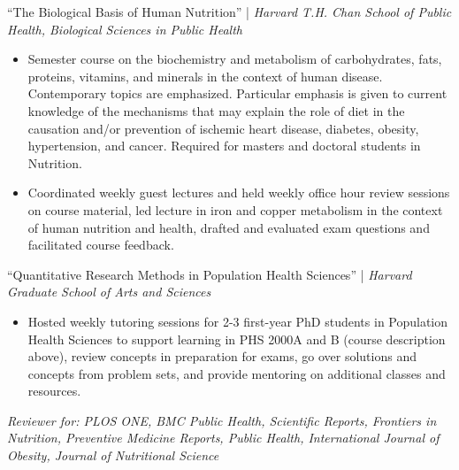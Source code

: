 \documentclass{cv_style}
\begin{document}
``The Biological Basis of Human Nutrition'' | \textit{Harvard T.H. Chan School of Public Health, Biological Sciences in Public Health}
\begin{itemize}
  \vspace{0em} \item Semester course on the biochemistry and metabolism of carbohydrates, fats, proteins, vitamins, and minerals in the context of human disease. Contemporary topics are emphasized. Particular emphasis is given to current knowledge of the mechanisms that may explain the role of diet in the causation and/or prevention of ischemic heart disease, diabetes, obesity, hypertension, and cancer. Required for masters and doctoral students in Nutrition.
  \item \parskip 1pt Coordinated weekly guest lectures and held weekly office hour review sessions on course material, led lecture in iron and copper metabolism in the context of human nutrition and health, drafted and evaluated exam questions and facilitated course feedback.
\end{itemize}

``Quantitative Research Methods in Population Health Sciences'' | \textit{Harvard Graduate School of Arts and Sciences}
\begin{itemize}
  \vspace{0em} \item Hosted weekly tutoring sessions for 2-3 first-year PhD students in Population Health Sciences to support learning in PHS 2000A and B (course description above), review concepts in preparation for exams, go over solutions and concepts from problem sets, and provide mentoring on additional classes and resources.
\end{itemize}


\parskip -5pt 
\nocite{*}
\printbibliography[title=Publications]

\vspace{2em}

\textit{Reviewer for: PLOS ONE, BMC Public Health, Scientific Reports, Frontiers in Nutrition, Preventive Medicine Reports, Public Health, International Journal of Obesity, Journal of Nutritional Science}
\end{document}
